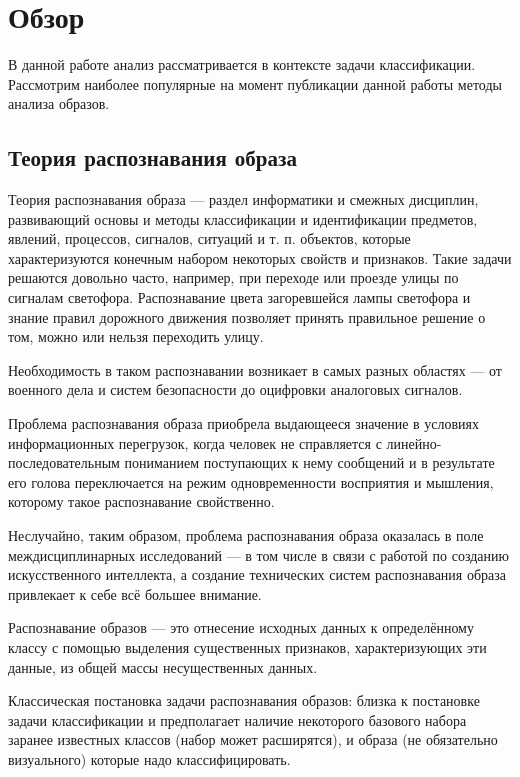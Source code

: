 \chapter{Обзор} \label{chapt2}
В данной работе анализ рассматривается в контексте задачи классификации. Рассмотрим наиболее популярные на момент публикации данной работы методы анализа образов.

\section{Теория распознавания образа}

Теория распознавания образа --- раздел информатики и смежных дисциплин, развивающий основы и методы классификации и идентификации предметов, явлений, процессов, сигналов, ситуаций и т. п. объектов, которые характеризуются конечным набором некоторых свойств и признаков. Такие задачи решаются довольно часто, например, при переходе или проезде улицы по сигналам светофора. Распознавание цвета загоревшейся лампы светофора и знание правил дорожного движения позволяет принять правильное решение о том, можно или нельзя переходить улицу.

Необходимость в таком распознавании возникает в самых разных областях --- от военного дела и систем безопасности до оцифровки аналоговых сигналов.

Проблема распознавания образа приобрела выдающееся значение в условиях информационных перегрузок, когда человек не справляется с линейно-последовательным пониманием поступающих к нему сообщений и в результате его голова переключается на режим одновременности восприятия и мышления, которому такое распознавание свойственно.

Неслучайно, таким образом, проблема распознавания образа оказалась в поле междисциплинарных исследований --- в том числе в связи с работой по созданию искусственного интеллекта, а создание технических систем распознавания образа привлекает к себе всё большее внимание.

Распознавание образов --- это отнесение исходных данных к определённому классу с помощью выделения существенных признаков, характеризующих эти данные, из общей массы несущественных данных.

Классическая постановка задачи распознавания образов: близка к постановке задачи классификации и предполагает наличие некоторого базового набора заранее известных классов (набор может расширятся), и образа (не обязательно визуального) которые надо классифицировать.

